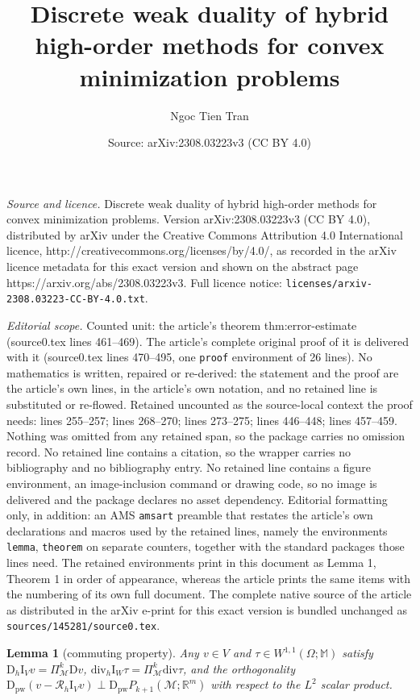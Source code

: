 \documentclass[10pt,a4paper]{amsart}
\title{Discrete weak duality of hybrid high-order methods for convex minimization problems}
\author{Ngoc Tien Tran}
\date{Source: arXiv:2308.03223v3 (CC BY 4.0)}
\newtheorem{lemma}{Lemma}
\newcommand{\D}{\mathrm{D}}
\newcommand{\I}{\mathrm{I}}
\newcommand{\M}{\mathbb{M}}
\newcommand{\Mcal}{\mathcal{M}}
\newcommand{\R}{\mathbb{R}}
\renewcommand{\div}{\mathrm{div}}
\newcommand{\pw}{\mathrm{pw}}
\begin{document}
\maketitle

\noindent\emph{Source and licence.} Discrete weak duality of hybrid high-order methods for convex minimization problems. Version arXiv:2308.03223v3 (CC BY 4.0), distributed by arXiv under the Creative Commons Attribution 4.0 International licence, http://creativecommons.org/licenses/by/4.0/, as recorded in the arXiv licence metadata for this exact version and shown on the abstract page https://arxiv.org/abs/2308.03223v3. Full licence notice: \texttt{licenses/arxiv-2308.03223-CC-BY-4.0.txt}.\par\smallskip

\noindent\textit{Editorial scope.} Counted unit: the article's theorem thm:error-estimate (source0.tex lines 461--469). The article's complete original proof of it is delivered with it (source0.tex lines 470--495, one \texttt{proof} environment of 26 lines). No mathematics is written, repaired or re-derived: the statement and the proof are the article's own lines, in the article's own notation, and no retained line is substituted or re-flowed.  Retained uncounted as the source-local context the proof needs: lines 255--257; lines 268--270; lines 273--275; lines 446--448; lines 457--459.  Nothing was omitted from any retained span, so the package carries no omission record.  No retained line contains a citation, so the wrapper carries no bibliography and no bibliography entry.  No retained line contains a figure environment, an image-inclusion command or drawing code, so no image is delivered and the package declares no asset dependency.  Editorial formatting only, in addition: an AMS \texttt{amsart} preamble that restates the article's own declarations and macros used by the retained lines, namely the environments \texttt{lemma}, \texttt{theorem} on separate counters, together with the standard packages those lines need.  The retained environments print in this document as Lemma 1, Theorem 1 in order of appearance, whereas the article prints the same items with the numbering of its own full document.  The complete native source of the article as distributed in the arXiv e-print for this exact version is bundled unchanged as \texttt{sources/145281/source0.tex}.
\begin{lemma}[commuting property]\label{lem:commuting-property}
	Any $v \in V$ and $\tau \in W^{1,1}(\Omega;\M)$ satisfy $\D_h \I_{V} v = \Pi_\Mcal^k \D v$, $\div_h \I_W \tau = \Pi_\Mcal^k \div \tau$, and the orthogonality $\D_\pw(v - \mathcal{R}_h \I_V v) \perp \D_\pw P_{k+1}(\Mcal;\R^m)$ with respect to the $L^2$ scalar product.
\end{lemma}
\end{document}
